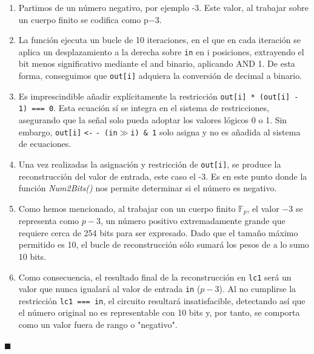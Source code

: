 \documentclass[a4paper,12pt]{report}
\begin{document}
	\begin{mi_ejemplo}
		\caption{\textcolor{black}{Comportamiento Num2Bits(10)}}
		\label{ex:num2bits}
		\begin{enumerate}
			
			\item Partimos de un número negativo, por ejemplo -3. Este valor, al trabajar sobre un cuerpo finito se codifica como p$-$3.
			
			\item La función ejecuta un bucle de 10 iteraciones, en el que en cada iteración se aplica un desplazamiento a la derecha sobre \texttt{in} en i posiciones, extrayendo el bit menos significativo mediante el and binario, aplicando AND 1. De esta forma, conseguimos que \texttt{out[i]} adquiera la conversión de decimal a binario. 
			
			\item Es imprescindible añadir explícitamente la restricción \texttt{out[i] * (out[i] - 1) === 0}. Esta ecuación sí se integra en el sistema de restricciones, asegurando que la señal solo pueda adoptar los valores lógicos 0 o 1. Sin embargo, \texttt{out[i]} \texttt{<-} \texttt{-}\texttt{ (in}$\gg$\texttt{i) \& 1} solo asigna y no es añadida al sistema de ecuaciones.
			
			\item Una vez realizadas la asignación y restricción de \texttt{out[i]}, se produce la reconstrucción del valor de entrada, este caso el -3. Es en este punto donde la función \textit{Num2Bits()} nos permite determinar si el número es negativo. 
			
			\item Como hemos mencionado, al trabajar con un cuerpo finito $\mathbb{F}_p$, el valor $-3$ se representa como $p-3$, un número positivo extremadamente grande que requiere cerca de 254 bits para ser expresado. Dado que el tamaño máximo permitido es 10, el bucle de reconstrucción sólo sumará los pesos de a lo sumo 10 bits. 
			
			\item Como consecuencia, el resultado final de la reconstrucción en \texttt{lc1} será un valor que nunca igualará al valor de entrada \texttt{in} ($p-3$). Al no cumplirse la restricción \texttt{lc1 === in}, el circuito resultará insatisfacible, detectando así que el número original no es representable con 10 bits y, por tanto, se comporta como un valor fuera de rango o "negativo".
		\end{enumerate}
		
		
		\hspace*{\fill} $\blacksquare$
	\end{mi_ejemplo}
	
\end{document}

